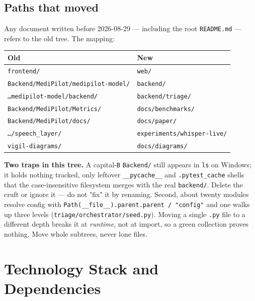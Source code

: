 \documentclass[10pt,a4paper,twocolumn]{article}
\newcommand{\pth}[1]{\textcolor{SecPurple}{\texttt{#1}}}
\newcommand{\cm}[1]{\texttt{#1}}
\begin{document}
\subsection{Paths that moved}
Any document written before 2026-08-29 --- including the root \pth{README.md} --- refers to the
old tree. The mapping:

\begin{center}\footnotesize\sffamily
\begin{tabular}{@{}p{4.05cm}p{3.75cm}@{}}
\toprule
\rowcolor{AccPurple!10}
\textbf{Old} & \textbf{New}\\
\midrule
\cm{frontend/} & \cm{web/}\\
\cm{Backend/MediPilot/}\newline\cm{medipilot-model/} & \cm{backend/}\\
\cm{\ldots medipilot-model/}\newline\cm{backend/} & \cm{backend/triage/}\\
\cm{Backend/MediPilot/Metrics/} & \cm{docs/benchmarks/}\\
\cm{Backend/MediPilot/docs/} & \cm{docs/paper/}\\
\cm{\ldots/speech\_layer/} & \cm{experiments/whisper-live/}\\
\cm{vigil-diagrams/} & \cm{docs/diagrams/}\\
\bottomrule
\end{tabular}
\end{center}

\begin{tcolorbox}[mpwarn]
\textbf{Two traps in this tree.} A capital-\cm{B} \pth{Backend/} still appears in \cm{ls} on
Windows; it holds nothing tracked, only leftover \cm{\_\_pycache\_\_} and \cm{.pytest\_cache}
shells that the case-insensitive filesystem merges with the real \pth{backend/}. Delete the cruft
or ignore it --- do not "fix" it by renaming. Second, about twenty modules resolve config with
\cm{Path(\_\_file\_\_).parent.parent / "config"} and one walks up three levels
(\pth{triage/orchestrator/seed.py}). Moving a single \cm{.py} file to a different depth breaks it
at \emph{runtime}, not at import, so a green collection proves nothing. Move whole subtrees, never
lone files.
\end{tcolorbox}

\section{Technology Stack and Dependencies}
\label{sec:stack}
\end{document}
